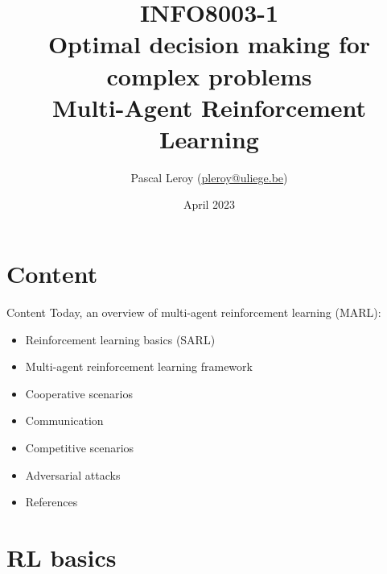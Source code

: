 \documentclass[9pt, hyperref={pdfusetitle,colorlinks=true,allcolors=DarkBlue}]{beamer}
\author{Pascal Leroy (\href{mailto:pleroy@uliege.be}{pleroy@uliege.be})}
\begin{document}
\title{
INFO8003-1 \\
Optimal decision making for complex problems
\\
\vspace{.7cm}
Multi-Agent Reinforcement Learning
}

\date{April 2023}
\maketitle


\section*{Content}
\begin{frame}{Content}
Today, an overview of multi-agent reinforcement learning (MARL):
\begin{itemize}
\vfill
\item Reinforcement learning basics (SARL)
\vfill
\item Multi-agent reinforcement learning framework
\vfill
\item Cooperative scenarios
\vfill
\item Communication
\vfill
\item Competitive scenarios
\vfill
\item Adversarial attacks
\vfill
\item References
\end{itemize}

\end{frame}

\section{RL basics}
\end{document}
